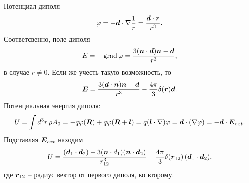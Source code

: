 Потенциал диполя
\begin{equation*}
    \varphi = - \mbox{\boldmath $d$} \cdot \nabla \frac{1}{r} = \frac{\mbox{\boldmath $d$} \cdot \mbox{\boldmath $r$}}{r^3}.
\end{equation*}
Соответсвенно, поле диполя
\begin{equation*}
    E = - \mathop{\mathrm{grad}}\nolimits \varphi = \frac{3 (\mbox{\boldmath $n$} \cdot \mbox{\boldmath $d$}) \mbox{\boldmath $n$} - \mbox{\boldmath $d$}}{r^3},
\end{equation*}
в случае $r \neq 0$. Если же учесть такую возможность, то
\begin{equation*}
    \mbox{\boldmath $E$} = \frac{3 (\mbox{\boldmath $d$} \cdot \mbox{\boldmath $n$})\mbox{\boldmath $n$}-\mbox{\boldmath $d$}}{r^3} - \frac{4\pi}{3} \delta(\mbox{\boldmath $r$}) \mbox{\boldmath $d$}.
\end{equation*}
Потенциальная энергия диполя:
\begin{equation*}
    U = \int d^3 r\, \rho A_0 = - q \varphi(\mbox{\boldmath $R$}) + q \varphi(\mbox{\boldmath $R$}+\mbox{\boldmath $l$}) = q (\mbox{\boldmath $l$} \cdot \nabla)\varphi = \mbox{\boldmath $d$} \cdot (\nabla \varphi) = - \mbox{\boldmath $d$} \cdot \mbox{\boldmath $E$}_{ext}.
\end{equation*}
Подставляя $\mbox{\boldmath $E$}_{ext}$ находим
\begin{equation*}
    U = \frac{(\mbox{\boldmath $d$}_1 \cdot \mbox{\boldmath $d$}_2)-3(\mbox{\boldmath $n$} \cdot d_1)(\mbox{\boldmath $n$} \cdot \mbox{\boldmath $d$}_2)}{r_{12}^{3}} + \frac{4\pi}{3} \delta(\mbox{\boldmath $r$}_{12}) \, (\mbox{\boldmath $d$}_1 \cdot \mbox{\boldmath $d$}_2),
\end{equation*}
где $\mbox{\boldmath $r$}_{12}$ -- радиус вектор от первого диполя, ко второму.

